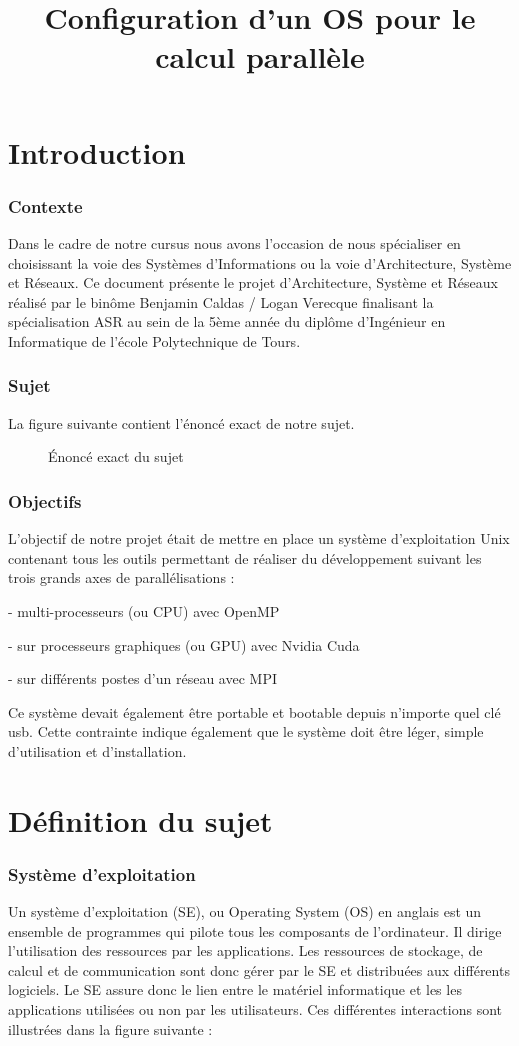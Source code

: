 \documentclass[final]{polytech/polytech}
\title{Configuration d’un OS pour le calcul parallèle}
\begin{document}
\part{Introduction}

\section{Contexte}
Dans le cadre de notre cursus nous avons l’occasion de nous spécialiser en choisissant la voie des Systèmes d’Informations ou la voie d’Architecture, Système et Réseaux. Ce document présente le projet d’Architecture, Système et Réseaux réalisé par le binôme Benjamin Caldas / Logan Verecque finalisant la spécialisation ASR au sein de la 5ème année du diplôme d’Ingénieur en Informatique de l’école Polytechnique de Tours.

\section{Sujet}
La figure suivante contient l'énoncé exact de notre sujet.

\begin{figure}
	\caption{Énoncé exact du sujet}
	\label{fig:enonce_sujet_projet_asr}
\end{figure}

\section{Objectifs}
L’objectif de notre projet était de mettre en place un système d’exploitation Unix contenant tous les outils permettant de réaliser du développement suivant les trois grands axes de parallélisations :

- multi-processeurs (ou CPU) avec OpenMP

- sur processeurs graphiques (ou GPU) avec Nvidia Cuda

- sur différents postes d'un réseau avec MPI

Ce système devait également être portable et bootable depuis n’importe quel clé usb. Cette contrainte indique également que le système doit être léger, simple d’utilisation et d’installation.

\part{Définition du sujet}

\section{Système d'exploitation}
Un système d'exploitation (SE), ou Operating System (OS) en anglais est un ensemble de programmes qui pilote tous les composants de l'ordinateur. Il dirige l'utilisation des ressources par les applications. Les ressources de stockage, de calcul et de communication sont donc gérer par le SE et distribuées aux différents logiciels. Le SE assure donc le lien entre le matériel informatique et les les applications utilisées ou non par les utilisateurs. Ces différentes interactions sont illustrées dans la figure suivante :
\end{document}
